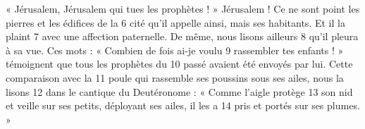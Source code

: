« Jérusalem, Jérusalem qui tues les prophètes ! »
Jérusalem ! Ce ne sont point les pierres et les édifices de la	 
6	 	cité qu'il appelle ainsi, mais ses habitants. Et il la plaint	 
7	 	avec une affection paternelle. De même, nous lisons ailleurs	 
8	 	qu'il pleura à sa vue. Ces mots : « Combien de fois ai-je voulu	 
9	 	rassembler tes enfants ! » témoignent que tous les prophètes du	 
10	 	passé avaient été envoyés par lui. Cette comparaison avec la	 
11	 	poule qui rassemble ses poussins sous ses ailes, nous la lisons	 
12	 	dans le cantique du Deutéronome : « Comme l'aigle protège	 
13	 	son nid et veille sur ses petits, déployant ses ailes, il les a	 
14	 	pris et portés sur ses plumes. »